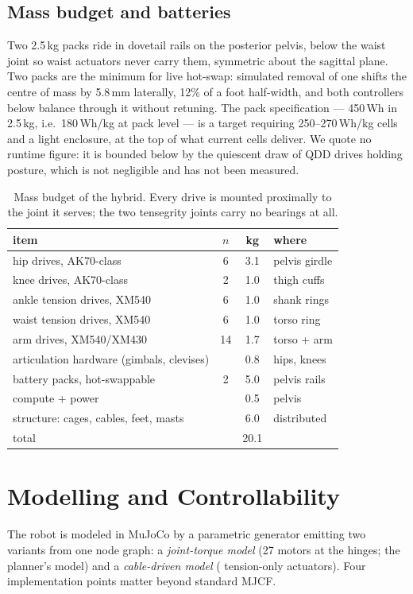 \documentclass[conference]{IEEEtran}
\begin{document}
\subsection{Mass budget and batteries}
Two 2.5\,kg packs ride in dovetail rails on the posterior pelvis, below the
waist joint so waist actuators never carry them, symmetric about the sagittal
plane. Two packs are the minimum for live hot-swap: simulated removal of one
shifts the centre of mass by 5.8\,mm laterally, 12\% of a foot half-width, and
both controllers below balance through it without retuning. The pack
specification --- 450\,Wh in 2.5\,kg, i.e.\ 180\,Wh/kg at pack level --- is a
target requiring 250--270\,Wh/kg cells and a light enclosure, at the top of
what current cells deliver. We quote no runtime figure: it is bounded below by
the quiescent draw of \numMotors{} QDD drives holding posture, which is not
negligible and has not been measured.

\begin{table}[tb]
\centering
\caption{Mass budget of the hybrid. Every drive is mounted proximally to the
joint it serves; the two tensegrity joints carry no bearings at all.}
\label{tab:mass}
\setlength{\tabcolsep}{4pt}%
\begin{tabular}{@{}lccl@{}}
\toprule
item & $n$ & kg & where\\
\midrule
hip drives, AK70-class & 6 & 3.1 & pelvis girdle\\
knee drives, AK70-class & 2 & 1.0 & thigh cuffs\\
ankle tension drives, XM540 & 6 & 1.0 & shank rings\\
waist tension drives, XM540 & 6 & 1.0 & torso ring\\
arm drives, XM540/XM430 & 14 & 1.7 & torso + arm\\
articulation hardware (gimbals, clevises) & & 0.8 & hips, knees\\
battery packs, hot-swappable & 2 & 5.0 & pelvis rails\\
compute + power & & 0.5 & pelvis\\
structure: cages, cables, feet, masts & & 6.0 & distributed\\
\midrule
total & & 20.1 & \\
\bottomrule
\end{tabular}
\end{table}

\section{Modelling and Controllability}
\label{sec:model}
The robot is modeled in MuJoCo \cite{todorov2012mujoco} by a parametric
generator emitting two variants from one node graph: a \emph{joint-torque
model} (27 motors at the hinges; the planner's model) and a
\emph{cable-driven model} (\numActuatable{} tension-only actuators). Four
implementation points matter beyond standard MJCF.
\end{document}
